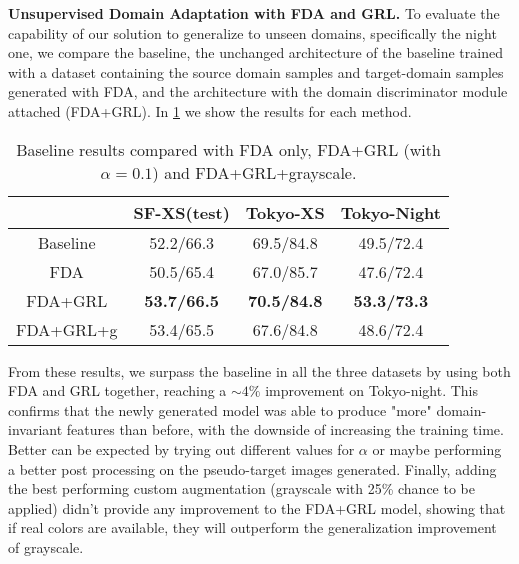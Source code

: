 \documentclass[10pt,twocolumn,letterpaper]{article}
\begin{document}
\textbf{Unsupervised Domain Adaptation with FDA and GRL.}
To evaluate the capability of our solution to generalize to unseen domains, specifically the night one, we compare the baseline, the unchanged architecture of the baseline trained with a dataset containing the source domain samples and target-domain samples generated with FDA, and the architecture with the domain discriminator module attached (FDA+GRL). In \cref{tab:fda+grl} we show the results for each method.

\begin{table}[htp]
  \centering
  \begin{tabular}{@{}cccc@{}}
    \toprule
    & SF-XS(test) & Tokyo-XS & Tokyo-Night\\
    \midrule
    Baseline & 52.2/66.3 & 69.5/84.8 & 49.5/72.4 \\
    FDA & 50.5/65.4 & 67.0/85.7 & 47.6/72.4 \\
    FDA+GRL & \textbf{53.7/66.5} & \textbf{70.5/84.8} & \textbf{53.3/73.3}\\
    FDA+GRL+g & 53.4/65.5 & 67.6/84.8 & 48.6/72.4\\
    \bottomrule
  \end{tabular}
  \caption{Baseline results compared with FDA only, FDA+GRL (with $\alpha=0.1$) and FDA+GRL+grayscale.}
  \label{tab:fda+grl}
\end{table}

From these results, we surpass the baseline in all the three datasets by using both FDA and GRL together, reaching a $\sim4\%$ improvement on Tokyo-night. This confirms that the newly generated model was able to produce "more" domain-invariant features than before, with the downside of increasing the training time. Better can be expected by trying out different values for $\alpha$ or maybe performing a better post processing on the pseudo-target images generated.
Finally, adding the best performing custom augmentation (grayscale with 25\% chance to be applied) didn't provide any improvement to the FDA+GRL model, showing that if real colors are available, they will outperform the generalization improvement of grayscale.
\newline
\end{document}

